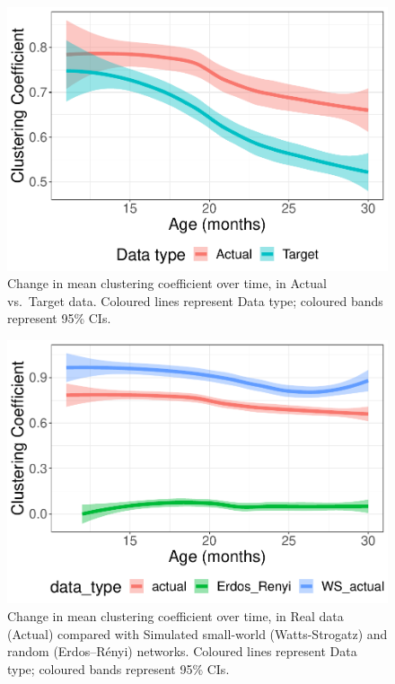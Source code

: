 \documentclass[
  man]{apa6}
\begin{document}
\begin{figure}
\centering
\includegraphics{NetworkGraphs_files/figure-latex/Figure-clust-coef-DT-1.pdf}
\caption{\label{fig:Figure-clust-coef-DT}Change in mean clustering coefficient over time, in Actual vs.~Target data. Coloured lines represent Data type; coloured bands represent 95\% CIs.}
\end{figure}

\begin{figure}
\centering
\includegraphics{NetworkGraphs_files/figure-latex/Figure-clust-coef-all-1.pdf}
\caption{\label{fig:Figure-clust-coef-all}Change in mean clustering coefficient over time, in Real data (Actual) compared with Simulated small-world (Watts-Strogatz) and random (Erdos--Rényi) networks. Coloured lines represent Data type; coloured bands represent 95\% CIs.}
\end{figure}
\end{document}
